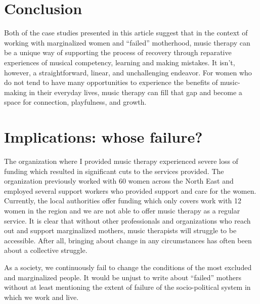 \documentclass[authordate, empirical, issue]{jote-new-article}
\begin{document}
\section{Conclusion}







Both of the case studies presented in this article suggest that in the context of working with marginalized women and “failed” motherhood, music therapy can be a unique way of supporting the process of recovery through reparative experiences of musical competency, learning and making mistakes. It isn't, however, a straightforward, linear, and unchallenging endeavor. For women who do not tend to have many opportunities to experience the benefits of music-making in their everyday lives, music therapy can fill that gap and become a space for connection, playfulness, and growth.







\section{Implications: whose failure?}







The organization where I provided music therapy experienced severe loss of funding which resulted in significant cuts to the services provided. The organization previously worked with 60 women across the North East and employed several support workers who provided support and care for the women. Currently, the local authorities offer funding which only covers work with 12 women in the region and we are not able to offer music therapy as a regular service. It is clear that without other professionals and organizations who reach out and support marginalized mothers, music therapists will struggle to be accessible. After all, bringing about change in any circumstances has often been about a collective struggle.







As a society, we continuously fail to change the conditions of the most excluded and marginalized people. It would be unjust to write about “failed” mothers without at least mentioning the extent of failure of the socio-political system in which we work and live.
\end{document}
